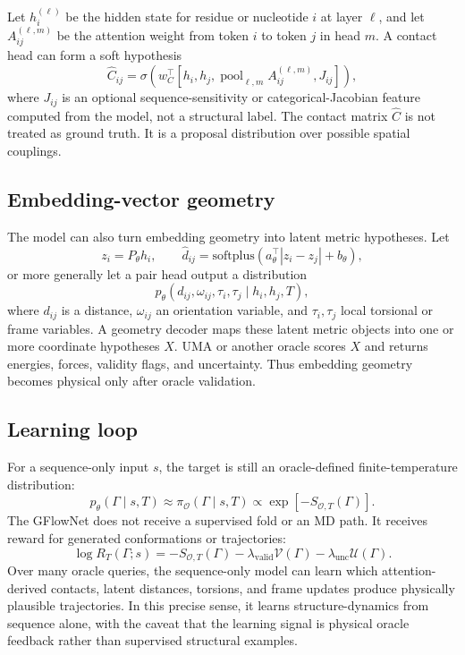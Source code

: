 \documentclass[11pt]{article}
\newcommand{\oracle}{\mathcal{O}}
\begin{document}
Let $h_i^{(\ell)}$ be the hidden state for residue or nucleotide $i$ at layer $\ell$, and let $A_{ij}^{(\ell,m)}$ be the attention weight from token $i$ to token $j$ in head $m$. A contact head can form a soft hypothesis
\[
\hat{C}_{ij}
=
\sigma\left(
w_C^\top
\left[
h_i,h_j,
\operatorname{pool}_{\ell,m} A_{ij}^{(\ell,m)},
J_{ij}
\right]
\right),
\]
where $J_{ij}$ is an optional sequence-sensitivity or categorical-Jacobian feature computed from the model, not a structural label. The contact matrix $\hat{C}$ is not treated as ground truth. It is a proposal distribution over possible spatial couplings.

\subsection{Embedding-vector geometry}

The model can also turn embedding geometry into latent metric hypotheses. Let
\[
z_i=P_\theta h_i,\qquad
\hat{d}_{ij}=\mathrm{softplus}(a_\theta^\top |z_i-z_j|+b_\theta),
\]
or more generally let a pair head output a distribution
\[
p_\theta(d_{ij},\omega_{ij},\tau_i,\tau_j\mid h_i,h_j,T),
\]
where $d_{ij}$ is a distance, $\omega_{ij}$ an orientation variable, and $\tau_i,\tau_j$ local torsional or frame variables. A geometry decoder maps these latent metric objects into one or more coordinate hypotheses $X$. UMA or another oracle scores $X$ and returns energies, forces, validity flags, and uncertainty. Thus embedding geometry becomes physical only after oracle validation.

\subsection{Learning loop}

For a sequence-only input $s$, the target is still an oracle-defined finite-temperature distribution:
\[
p_\theta(\Gamma\mid s,T)
\approx
\pi_{\oracle}(\Gamma\mid s,T)
\propto
\exp[-S_{\oracle,T}(\Gamma)].
\]
The GFlowNet does not receive a supervised fold or an MD path. It receives reward for generated conformations or trajectories:
\[
\log R_T(\Gamma;s)=
-S_{\oracle,T}(\Gamma)
-\lambda_{\mathrm{valid}}\mathcal{V}(\Gamma)
-\lambda_{\mathrm{unc}}\mathcal{U}(\Gamma).
\]
Over many oracle queries, the sequence-only model can learn which attention-derived contacts, latent distances, torsions, and frame updates produce physically plausible trajectories. In this precise sense, it learns structure-dynamics from sequence alone, with the caveat that the learning signal is physical oracle feedback rather than supervised structural examples.
\end{document}
